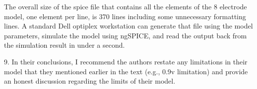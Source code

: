\documentclass[journal, a4paper]{IEEEtran}
\begin{document}
{    {
        \color{blue}
        The overall size of the spice file that contains all the elements of the 8 electrode model, one element per line, is 370 lines including some unnecessary formatting lines. A standard Dell optiplex workstation can generate that file using the model parameters, simulate the model using ngSPICE, and read the output back from the simulation result in under a second.
    }

    9. In their conclusions, I recommend the authors restate any limitations in their model that they mentioned earlier in the text (e.g., 0.9v limitation) and provide an honest discussion regarding the limits of their model.
    {
        \color{blue}

    }
}
\end{document}
